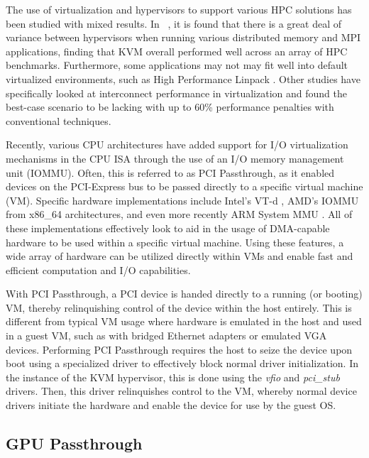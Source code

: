 \documentclass[10pt]{sigplanconf}
\begin{document}
The use of virtualization and hypervisors to support various HPC solutions has been studied with mixed results.  In ~\cite{Younge2011cloud}, it is found that there is a great deal of variance between hypervisors when running various distributed memory and MPI applications, finding that KVM overall performed well across an array of HPC benchmarks.  Furthermore, some applications may not may fit well into default virtualized environments, such as High Performance Linpack \cite{Luszczek:2011:EHC}. Other studies have specifically looked at interconnect performance in virtualization and found the best-case scenario to be lacking \cite{Ramakrishnan2012} with up to 60\% performance penalties with conventional techniques.
 
Recently, various CPU architectures have added support for I/O virtualization mechanisms in the CPU ISA through the use of an I/O memory management unit (IOMMU). Often, this is referred to as PCI Passthrough, as it enabled devices on the PCI-Express bus to be passed directly to a specific virtual machine (VM).  Specific hardware implementations include Intel's VT-d \cite{intelvirtualization}, AMD's IOMMU \cite{amdiommu} from x86\_64 architectures, and even more recently ARM System MMU \cite{armmmu}.  All of these implementations effectively look to aid in the usage of DMA-capable hardware to be used within a specific virtual machine. Using these features, a wide array of hardware can be utilized directly within VMs and enable fast and efficient computation and I/O capabilities.

With PCI Passthrough, a PCI device is handed directly to a running (or booting) VM, thereby relinquishing control of the device within the host entirely. This is different from typical VM usage where hardware is emulated in the host and used in a guest VM, such as with bridged Ethernet adapters or emulated VGA devices. Performing PCI Passthrough requires the host to seize the device upon boot using a specialized driver to effectively block normal driver initialization. In the instance of the KVM hypervisor, this is done using the \emph{vfio} and \emph{pci\_stub} drivers. Then, this driver relinquishes control to the VM, whereby normal device drivers initiate the hardware and enable the device for use by the guest OS.  

\subsection{GPU Passthrough}
\end{document}

